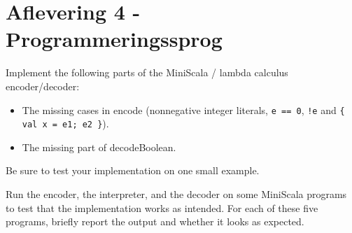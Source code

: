 \documentclass[working, oneside]{../../../Preambles/tuftebook}
\begin{document}
\let\cleardoublepage\clearpage
\thispagestyle{fancy}
\chapter{Aflevering 4 - Programmeringssprog}
\begin{exercise}[88]
Implement the following parts of the MiniScala / lambda calculus encoder/decoder:
\begin{itemize}
    \item The missing cases in encode (nonnegative integer literals, \texttt{e == 0}, \texttt{!e} and \texttt{\{ val x = e1; e2 \}}).
    \item The missing part of decodeBoolean.
\end{itemize}
Be sure to test your implementation on one small example.
\end{exercise}
\begin{solution}

\end{solution}
\begin{exercise}[89]
Run the encoder, the interpreter, and the decoder on some MiniScala programs to test that the implementation works as intended. For each of these five programs, briefly report the output and whether it looks as expected.
\end{exercise}
\end{document}
